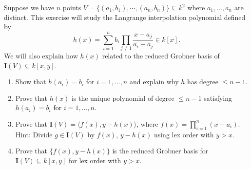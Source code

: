 \begin{tcolorbox}[title=Problem 14, breakable]
    Suppose we have $n$ points $V = \{(a_1, b_1), \cdots, (a_n, b_n)\} \subseteq k^2$
    where $a_1, \ldots, a_n$ are distinct. This exercise will study the 
    Langrange interpolation polynomial defined by 
    \[h(x) = \sum_{i = 1}^{n} b_i \prod_{j \ne 1} \frac{x - a_j}{a_i - a_j} \in k[x].\]
    We will also explain how $h(x)$ related to the reduced Grobner basis of 
    $\textbf{I}(V) \subseteq k[x, y]$.
    \begin{enumerate}
        \item Show that $h(a_i) = b_i$ for $i = 1, \ldots, n$ and explain why $h$ has degree $\le n - 1$.
        \item Prove that $h(x)$ is the unique polynomial of degree $\le n - 1$ satisfying $h(a_i) = b_i$ for $i = 1, \ldots, n$.
        \item Prove that $\textbf{I}(V) = \langle f(x), y - h(x) \rangle$, where $f(x) = \prod_{i = 1}^{n} (x - a_i)$. Hint: Divide $g \in \textbf{I}(V)$ by $f(x)$, $y - h(x)$ using lex order with $y > x$.
        \item Prove that $\{f(x), y - h(x)\}$ is the reduced Grobner basis for $\textbf{I}(V) \subseteq k[x, y]$ for lex order with $y > x$. 
    \end{enumerate}
\end{tcolorbox}